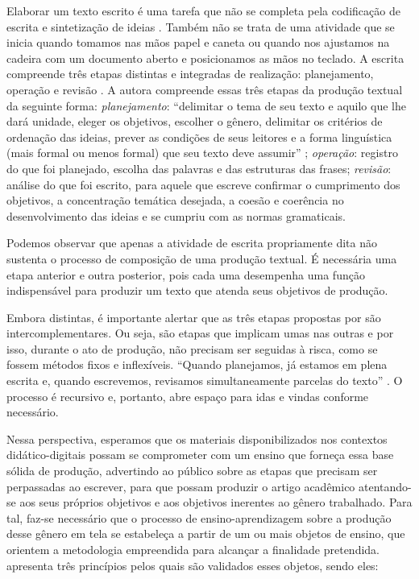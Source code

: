 Elaborar um texto escrito é uma tarefa que não se completa pela
codificação de escrita e sintetização de ideias \cite{garcez2020}. Também
não se trata de uma atividade que se inicia quando tomamos nas mãos
papel e caneta ou quando nos ajustamos na cadeira com um documento
aberto e posicionamos as mãos no teclado. A escrita compreende três
etapas distintas e integradas de realização: planejamento, operação e
revisão \cite{antunes2003}. A autora compreende essas três etapas da
produção textual da seguinte forma: \emph{planejamento}: ``delimitar o
tema de seu texto e aquilo que lhe dará unidade, eleger os objetivos,
escolher o gênero, delimitar os critérios de ordenação das ideias,
prever as condições de seus leitores e a forma linguística (mais formal
ou menos formal) que seu texto deve assumir'' \cite[p.~55]{antunes2003};
\emph{operação}: registro do que foi planejado, escolha das palavras e
das estruturas das frases; \emph{revisão}: análise do que foi escrito,
para aquele que escreve confirmar o cumprimento dos objetivos, a
concentração temática desejada, a coesão e coerência no desenvolvimento
das ideias e se cumpriu com as normas gramaticais.

Podemos observar que apenas a atividade de escrita propriamente dita não
sustenta o processo de composição de uma produção textual. É necessária
uma etapa anterior e outra posterior, pois cada uma desempenha uma
função indispensável para produzir um texto que atenda seus objetivos de
produção.

Embora distintas, é importante alertar que as três etapas propostas por
\textcite{antunes2003} são intercomplementares. Ou seja, são etapas que implicam
umas nas outras e por isso, durante o ato de produção, não precisam ser
seguidas à risca, como se fossem métodos fixos e inflexíveis. ``Quando
planejamos, já estamos em plena escrita e, quando escrevemos, revisamos
simultaneamente parcelas do texto'' \cite[p. 20]{garcez2020}. O processo é
recursivo e, portanto, abre espaço para idas e vindas conforme
necessário.

Nessa perspectiva, esperamos que os materiais disponibilizados nos
contextos didático-digitais possam se comprometer com um ensino que
forneça essa base sólida de produção, advertindo ao público sobre as
etapas que precisam ser perpassadas ao escrever, para que possam
produzir o artigo acadêmico atentando-se aos seus próprios objetivos e
aos objetivos inerentes ao gênero trabalhado. Para tal, faz-se
necessário que o processo de ensino-aprendizagem sobre a produção desse
gênero em tela se estabeleça a partir de um ou mais objetos de ensino,
que orientem a metodologia empreendida para alcançar a finalidade
pretendida. \textcite[p.~11-12]{linodearaujo2014} apresenta três princípios
pelos quais são validados esses objetos, sendo eles:


